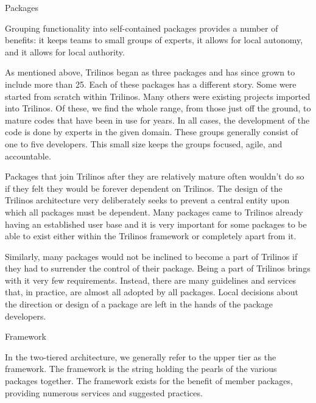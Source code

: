 \documentclass[12pt,relax]{article}
\begin{document}
    
    Packages
    
    Grouping functionality into self-contained packages provides a number of
    benefits:  it keeps teams to small groups of experts, it allows for local
    autonomy, and it allows for local authority.
    
    As mentioned above, Trilinos began as three packages and has since grown to 
    include more than 25.  Each of these packages has a different story.  Some
    were started from scratch within Trilinos.  Many others were existing
    projects imported into Trilinos.  Of these, we find the whole range, from
    those just off the ground, to mature codes that have been in use for years.
    In all cases, the development of the code is done by experts in the given
    domain.  These groups generally consist of one to five developers.  This
    small size keeps the groups focused, agile, and accountable.
      
    Packages that join Trilinos after they are relatively mature often wouldn't
    do so if they felt they would be forever dependent on Trilinos.  The design
    of the Trilinos architecture very deliberately seeks to prevent a central
    entity upon which all packages must be dependent.  Many packages came to 
    Trilinos already having an established user base and it is very important
    for some packages to be able to exist either within the Trilinos framework
    or completely apart from it.
    
    Similarly, many packages would not be inclined to become a part of Trilinos
    if they had to surrender the control of their package.  Being a part of
    Trilinos brings with it very few requirements.  Instead, there are many
    guidelines and services that, in practice, are almost all adopted by all
    packages.  Local decisions about the direction or design of a package are
    left in the hands of the package developers.
  
    
    Framework
    
    In the two-tiered architecture, we generally refer to the upper tier as the
    framework.  The framework is the string holding the pearls of the various
    packages together.  The framework exists for the benefit of member
    packages, providing numerous services and suggested practices.
  
\end{document}
